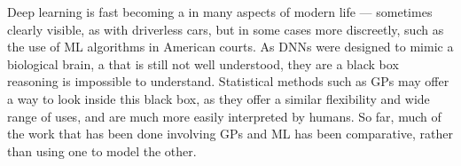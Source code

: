 Deep learning is fast becoming a  in many aspects of modern life --- sometimes clearly visible, as with driverless cars, but in some cases more discreetly, such as the use of \ac{ML} algorithms in American courts.
As \acp{DNN} were designed to mimic a biological brain, a  that is still not well understood, they are a \ac{black box}  reasoning is impossible to understand.
Statistical methods such as \acp{GP} may offer a way to look inside this black box, as they offer a similar flexibility and wide range of uses, and are much more easily interpreted by humans.
So far, much of the work that has been done involving \acp{GP} and \ac{ML} has been comparative, rather than using one to model the other.
